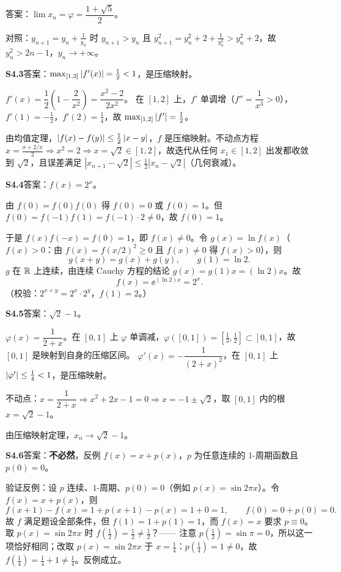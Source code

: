 答案：$\lim x_n=\varphi=\dfrac{1+\sqrt5}{2}$。

对照：$y_{n+1}=y_n+\frac1{y_n}$ 时 $y_{n+1}>y_n$ 且 $y_{n+1}^{2}=y_{n}^{2}+2+\frac{1}{y_{n}^{2}}>y_{n}^{2}+2$，故 $y_{n}^{2}>2n-1$，$y_n\to+\infty$。

\medskip
\noindent\textbf{S4.3}\quad 答案：$\max_{[1,2]}\left\lvert f'(x)\right\rvert=\frac12<1$，是压缩映射。

$f'(x)=\dfrac{1}{2}\left(1-\dfrac{2}{x^{2}}\right)=\dfrac{x^{2}-2}{2x^{2}}$。
在 $[1,2]$ 上，$f'$ 单调增（$f''=\dfrac{1}{x^{3}}>0$），$f'(1)=-\frac12$，$f'(2)=\frac14$，故 $\max_{[1,2]}\left\lvert f'\right\rvert=\frac12$。

由均值定理，$\left\lvert f(x)-f(y)\right\rvert\leq\frac12\left\lvert x-y\right\rvert$，$f$ 是压缩映射。不动点方程 $x=\frac{x+2/x}{2}\Rightarrow x^{2}=2\Rightarrow x=\sqrt2\in[1,2]$，故迭代从任何 $x_1\in[1,2]$ 出发都收敛到 $\sqrt2$，且误差满足 $|x_{n+1}-\sqrt2|\leq\frac12|x_n-\sqrt2|$（几何衰减）。

\medskip
\noindent\textbf{S4.4}\quad 答案：$f(x)=2^{x}$。

由 $f(0)=f(0)f(0)$ 得 $f(0)=0$ 或 $f(0)=1$。但 $f(0)=f(-1)f(1)=f(-1)\cdot2\neq0$，故 $f(0)=1$。

于是 $f(x)f(-x)=f(0)=1$，即 $f(x)\neq0$。令 $g(x)=\ln f(x)$（$f(x)>0$：由 $f(x)=f(x/2)^{2}\geq0$ 且 $f(x)\neq0$ 得 $f(x)>0$），则
\[
g(x+y)=g(x)+g(y),\qquad g(1)=\ln2.
\]
$g$ 在 $\mathbb{R}$ 上连续，由连续 Cauchy 方程的结论 $g(x)=g(1)x=(\ln2)x$。故
\[
f(x)=\ee^{(\ln2)x}=2^{x}.
\]
（校验：$2^{x+y}=2^{x}\cdot2^{y}$，$f(1)=2$。）

\medskip
\noindent\textbf{S4.5}\quad 答案：$\sqrt2-1$。

$\varphi(x)=\dfrac{1}{2+x}$。在 $[0,1]$ 上 $\varphi$ 单调减，$\varphi([0,1])=[\frac13,\frac12]\subset[0,1]$，故 $[0,1]$ 是映射到自身的压缩区间。
$\varphi'(x)=-\dfrac{1}{(2+x)^{2}}$，在 $[0,1]$ 上 $\left\lvert \varphi'\right\rvert\leq\frac14<1$，是压缩映射。

不动点：$x=\dfrac{1}{2+x}\Rightarrow x^{2}+2x-1=0\Rightarrow x=-1\pm\sqrt2$，取 $[0,1]$ 内的根 $x=\sqrt2-1$。

由压缩映射定理，$x_n\to\sqrt2-1$。

\medskip
\noindent\textbf{S4.6}\quad 答案：\textbf{不必然}，反例 $f(x)=x+p(x)$，$p$ 为任意连续的 $1$-周期函数且 $p(0)=0$。

验证反例：设 $p$ 连续、$1$-周期、$p(0)=0$（例如 $p(x)=\sin 2\pi x$）。令 $f(x)=x+p(x)$，则
\[
f(x+1)-f(x)=1+p(x+1)-p(x)=1+0=1,\qquad f(0)=0+p(0)=0.
\]
故 $f$ 满足题设全部条件，但 $f(1)=1+p(1)=1$，而 $f(x)=x$ 要求 $p\equiv0$。取 $p(x)=\sin2\pi x$ 时 $f(\frac12)=\frac12\neq\frac12$？—— 注意 $p(\frac12)=\sin\pi=0$，所以这一项恰好相同；改取 $p(x)=\sin2\pi x$ 于 $x=\frac14$：$p(\frac14)=1\neq0$，故 $f(\frac14)=\frac14+1\neq\frac14$。反例成立。

